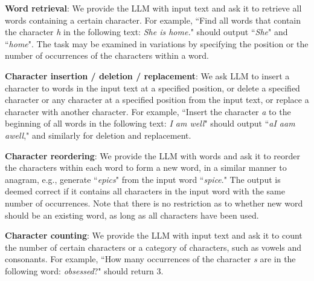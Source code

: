\documentclass{article}
\theoremstyle{plain}
\theoremstyle{definition}
\theoremstyle{remark}
\begin{document}
\textbf{Word retrieval}: We provide the LLM with input text and ask it to retrieve all words containing a certain character. For example, ``Find all words that contain the character \textit{h} in the following text: \textit{She is home.}" should output ``\textit{She}" and ``\textit{home}". The task may be examined in variations by specifying the position or the number of occurrences of the characters within a word.


\textbf{Character insertion / deletion / replacement}: We ask LLM to insert a character to words in the input text at a specified position, or delete a specified character or any character at a specified position from the input text, or replace a character with another character. For example, ``Insert the character \textit{a} to the beginning of all words in the following text: \textit{I am well}" should output ``\textit{aI aam awell}," and similarly for deletion and replacement.

\textbf{Character reordering}:
We provide the LLM with words and ask it to reorder the characters within each word to form a new word, in a similar manner to anagram, e.g., generate ``\textit{epics}" from the input word ``\textit{spice}." The output is deemed correct if it contains all characters in the input word with the same number of occurrences. Note that there is no restriction as to whether new word should be an existing word, as long as all characters have been used. 

\textbf{Character counting}: We provide the LLM with input text and ask it to count the number of certain characters or a category of characters, such as vowels and consonants. For example, ``How many occurrences of the character \textit{s} are in the following word: \textit{obsessed}?" should return 3.
\end{document}
